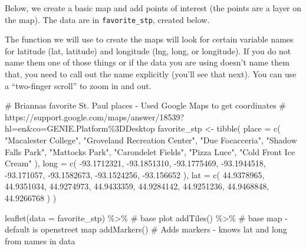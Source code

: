 \documentclass[
  letterpaper,
  DIV=11,
  numbers=noendperiod]{scrreprt}
\newenvironment{Shaded}{\begin{snugshade}}{\end{snugshade}}
\newcommand{\AttributeTok}[1]{\textcolor[rgb]{0.40,0.45,0.13}{#1}}
\newcommand{\CommentTok}[1]{\textcolor[rgb]{0.37,0.37,0.37}{#1}}
\newcommand{\FloatTok}[1]{\textcolor[rgb]{0.68,0.00,0.00}{#1}}
\newcommand{\FunctionTok}[1]{\textcolor[rgb]{0.28,0.35,0.67}{#1}}
\newcommand{\NormalTok}[1]{\textcolor[rgb]{0.00,0.23,0.31}{#1}}
\newcommand{\OtherTok}[1]{\textcolor[rgb]{0.00,0.23,0.31}{#1}}
\newcommand{\SpecialCharTok}[1]{\textcolor[rgb]{0.37,0.37,0.37}{#1}}
\newcommand{\StringTok}[1]{\textcolor[rgb]{0.13,0.47,0.30}{#1}}
\begin{document}
Below, we create a basic map and add points of interest (the points are
a layer on the map). The data are in \texttt{favorite\_stp}, created
below.

The function we will use to create the maps will look for certain
variable names for latitude (lat, latitude) and longitude (lng, long, or
longitude). If you do not name them one of those things or if the data
you are using doesn't name them that, you need to call out the name
explicitly (you'll see that next). You can use a ``two-finger scroll''
to zoom in and out.

\begin{Shaded}
\begin{Highlighting}[]
\CommentTok{\# Brianna\textquotesingle{}s favorite St. Paul places {-} Used Google Maps to get coordinates}
\CommentTok{\# https://support.google.com/maps/answer/18539?hl=en\&co=GENIE.Platform\%3DDesktop}
\NormalTok{favorite\_stp }\OtherTok{\textless{}{-}} \FunctionTok{tibble}\NormalTok{(}
  \AttributeTok{place =} \FunctionTok{c}\NormalTok{(}
    \StringTok{"Macalester College"}\NormalTok{, }\StringTok{"Groveland Recreation Center"}\NormalTok{,}
    \StringTok{"Due Focacceria"}\NormalTok{, }\StringTok{"Shadow Falls Park"}\NormalTok{, }\StringTok{"Mattocks Park"}\NormalTok{,}
    \StringTok{"Carondelet Fields"}\NormalTok{, }\StringTok{"Pizza Luce"}\NormalTok{, }\StringTok{"Cold Front Ice Cream"}
\NormalTok{  ),}
  \AttributeTok{long =} \FunctionTok{c}\NormalTok{(}
    \SpecialCharTok{{-}}\FloatTok{93.1712321}\NormalTok{, }\SpecialCharTok{{-}}\FloatTok{93.1851310}\NormalTok{,}
    \SpecialCharTok{{-}}\FloatTok{93.1775469}\NormalTok{, }\SpecialCharTok{{-}}\FloatTok{93.1944518}\NormalTok{, }\SpecialCharTok{{-}}\FloatTok{93.171057}\NormalTok{,}
    \SpecialCharTok{{-}}\FloatTok{93.1582673}\NormalTok{, }\SpecialCharTok{{-}}\FloatTok{93.1524256}\NormalTok{, }\SpecialCharTok{{-}}\FloatTok{93.156652}
\NormalTok{  ),}
  \AttributeTok{lat =} \FunctionTok{c}\NormalTok{(}
    \FloatTok{44.9378965}\NormalTok{, }\FloatTok{44.9351034}\NormalTok{, }\FloatTok{44.9274973}\NormalTok{,}
    \FloatTok{44.9433359}\NormalTok{, }\FloatTok{44.9284142}\NormalTok{, }\FloatTok{44.9251236}\NormalTok{,}
    \FloatTok{44.9468848}\NormalTok{, }\FloatTok{44.9266768}
\NormalTok{  )}
\NormalTok{)}
\end{Highlighting}
\end{Shaded}

\begin{Shaded}
\begin{Highlighting}[]
\FunctionTok{leaflet}\NormalTok{(}\AttributeTok{data =}\NormalTok{ favorite\_stp) }\SpecialCharTok{\%\textgreater{}\%} \CommentTok{\# base plot}
  \FunctionTok{addTiles}\NormalTok{() }\SpecialCharTok{\%\textgreater{}\%} \CommentTok{\# base map {-} default is openstreet map}
  \FunctionTok{addMarkers}\NormalTok{() }\CommentTok{\# Adds markers {-} knows lat and long from names in data}
\end{Highlighting}
\end{Shaded}
\end{document}
